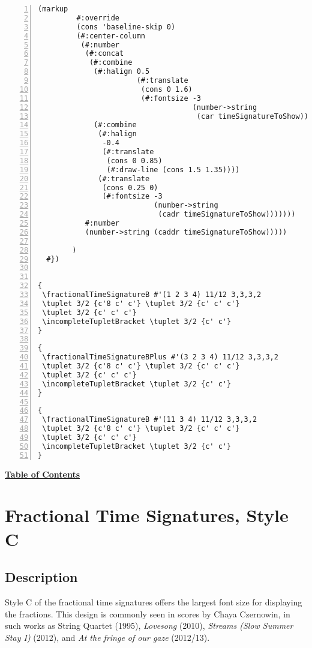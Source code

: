 \begin{Verbatim}[numbers=left,xleftmargin=5mm]
        (markup
         #:override
         (cons 'baseline-skip 0)
         (#:center-column
          (#:number
           (#:concat
            (#:combine
             (#:halign 0.5
                       (#:translate
                        (cons 0 1.6)
                        (#:fontsize -3
                                    (number->string
                                     (car timeSignatureToShow)))))
             (#:combine
              (#:halign
               -0.4
               (#:translate
                (cons 0 0.85)
                (#:draw-line (cons 1.5 1.35))))
              (#:translate
               (cons 0.25 0)
               (#:fontsize -3
                           (number->string
                            (cadr timeSignatureToShow)))))))
           #:number
           (number->string (caddr timeSignatureToShow)))))

        )
  #})


{
 \fractionalTimeSignatureB #'(1 2 3 4) 11/12 3,3,3,2
 \tuplet 3/2 {c'8 c' c'} \tuplet 3/2 {c' c' c'}
 \tuplet 3/2 {c' c' c'}
 \incompleteTupletBracket \tuplet 3/2 {c' c'}
}

{
 \fractionalTimeSignatureBPlus #'(3 2 3 4) 11/12 3,3,3,2
 \tuplet 3/2 {c'8 c' c'} \tuplet 3/2 {c' c' c'}
 \tuplet 3/2 {c' c' c'}
 \incompleteTupletBracket \tuplet 3/2 {c' c'}
}

{
 \fractionalTimeSignatureB #'(11 3 4) 11/12 3,3,3,2
 \tuplet 3/2 {c'8 c' c'} \tuplet 3/2 {c' c' c'}
 \tuplet 3/2 {c' c' c'}
 \incompleteTupletBracket \tuplet 3/2 {c' c'}
}
\end{Verbatim}

\hyperref[sec:toc]{\textbf{Table of Contents}}

\vfill \break




\section {Fractional Time Signatures, Style C}

\hfill
{}
\hfill

\subsection{Description}
Style C of the fractional time signatures offers the largest font size for displaying the fractions. This design is commonly seen in scores by Chaya Czernowin, in such works as String Quartet (1995),\autocite{RN1749}  \textit{Lovesong} (2010),\autocite{RN1751} \textit{Streams (Slow Summer Stay I)} (2012),\autocite{RN1750}  and \textit{At the fringe of our gaze} (2012/13).\autocite{RN1752}  

